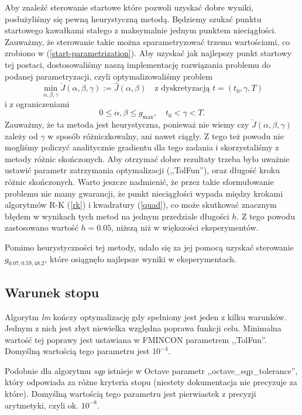 \documentclass[licencjacka]{pracamgr}
\begin{document}
Aby znaleźć sterowanie startowe które pozwoli uzyskać dobre wyniki, posłużyliśmy się pewną heurystyczną metodą. Będziemy szukać punktu startowego kawałkami stałego z maksymalnie jednym punktem nieciągłości.  Zauważmy, że sterowanie takie można sparametryzować trzema wartościami, co zrobiono w (\ref{start-parametrization}). Aby uzyskać jak najlepszy punkt startowy tej postaci, dostosowaliśmy naszą implementację rozwiązania problemu do podanej parametryzacji, czyli optymalizowaliśmy problem
\begin{equation}
  \min_{\alpha,\beta,\gamma} \check{J}(\alpha,\beta,\gamma) := \hat{J}(\alpha, \beta)\quad \text{z dyskretyzacją } t = (t_0, \gamma, T)
\end{equation}
i z ograniczeniami
\begin{equation}
  0 \le \alpha,\beta \le g_{\max}, \quad t_0 < \gamma < T.
\end{equation}
Zauważmy, że ta metoda jest heurystyczna, ponieważ nie wiemy czy $\check{J}(\alpha,\beta,\gamma)$ zależy od $\gamma$ w sposób różniczkowalny, ani nawet ciągły. Z tego też powodu nie mogliśmy policzyć analitycznie gradientu dla tego zadania i skorzystaliśmy z metody różnic skończonych. Aby otrzymać dobre rezultaty trzeba było uważnie ustawić parametr zatrzymania optymalizacji (,,TolFun''), oraz długość kroku różnic skończonych. Warto jeszcze nadmienić, że przez takie sformułowanie problemu nie mamy gwarancji, że punkt nieciągłości wypada między krokami algorytmów R-K (\ref{rk}) i kwadratury (\ref{quad}), co może skutkować znacznym błędem w wynikach tych metod na jednym przedziale długości $h$. Z tego powodu zastosowano wartość $h = 0.05$, niższą niż w większości eksperymentów.

Pomimo heurystyczności tej metody, udało się za jej pomocą uzyskać sterowanie $g_{0.07,0.59,48.2}$, które osiągnęło najlepsze wyniki w eksperymentach.

\subsection{Warunek stopu}
Algorytm {\it lm\/} kończy optymalizację gdy spełniony jest jeden z kilku warunków. Jednym z nich jest zbyt niewielka względna poprawa funkcji celu. Minimalna wartość tej poprawy jest ustawiana w FMINCON parametrem ,,TolFun''. Domyślną wartością tego parametru jest $10^{-4}$.

Podobnie dla algorytmu {\it sqp\/} istnieje w Octave parametr ,,octave\_sqp\_tolerance'', który odpowiada za różne kryteria stopu (niestety dokumentacja nie precyzuje za które). Domyślną wartością tego parametru jest pierwiastek z precyzji arytmetyki, czyli ok. $10^{-8}$.
\end{document}
